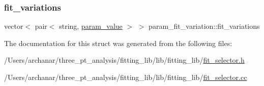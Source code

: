 \subsubsection{\texorpdfstring{fit\_variations}{fit\_variations}}
{\footnotesize\ttfamily vector$<$ pair$<$ string, \mbox{\hyperlink{structparam__value}{param\+\_\+value}} $>$ $>$ param\+\_\+fit\+\_\+variation\+::fit\+\_\+variations}



The documentation for this struct was generated from the following files\+:\begin{DoxyCompactItemize}
\item 
/\+Users/archanar/three\+\_\+pt\+\_\+analysis/fitting\+\_\+lib/lib/fitting\+\_\+lib/\mbox{\hyperlink{lib_2fitting__lib_2fit__selector_8h}{fit\+\_\+selector.\+h}}\item 
/\+Users/archanar/three\+\_\+pt\+\_\+analysis/fitting\+\_\+lib/lib/fitting\+\_\+lib/\mbox{\hyperlink{fit__selector_8cc}{fit\+\_\+selector.\+cc}}\end{DoxyCompactItemize}
